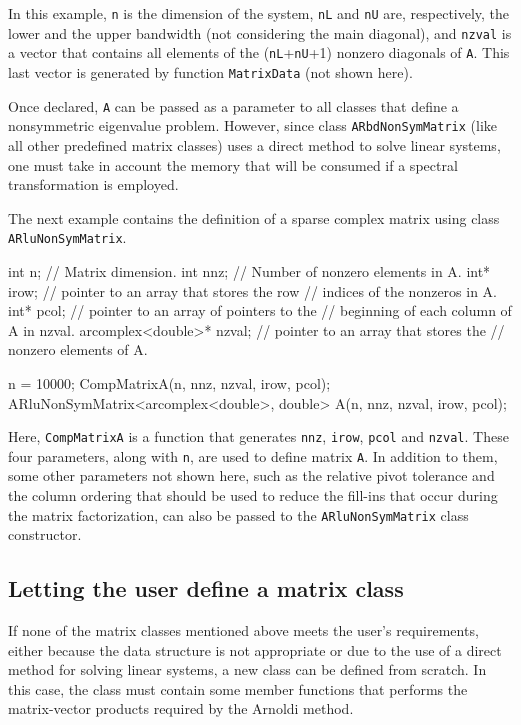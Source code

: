 In this example, \texttt{n} is the dimension of the system, \texttt{nL} and \texttt{nU} are, respectively, the lower and the upper bandwidth (not considering the main diagonal), and \texttt{nzval} is a vector that contains all elements of the (\texttt{nL}+\texttt{nU}+1) nonzero diagonals of \texttt{A}. This last vector is generated by function \texttt{MatrixData} (not shown here).

Once declared, \texttt{A} can be passed as a parameter to all \ARPP{} classes that define a nonsymmetric eigenvalue problem. However, since class \texttt{ARbdNonSymMatrix} (like all other predefined matrix classes) uses a direct method to solve linear systems, one must take in account the memory that will be consumed if a spectral transformation is employed.

The next example contains the definition of a sparse complex matrix using class \texttt{ARluNonSymMatrix}.

\begin{cppcode}
int                n;     // Matrix dimension.
int                nnz;   // Number of nonzero elements in A.
int*               irow;  // pointer to an array that stores the row
                          // indices of the nonzeros in A.
int*               pcol;  // pointer to an array of pointers to the
                          // beginning of each column of A in nzval.
arcomplex<double>* nzval; // pointer to an array that stores the
                          // nonzero elements of A.

n = 10000;
CompMatrixA(n, nnz, nzval, irow, pcol);
ARluNonSymMatrix<arcomplex<double>, double> A(n, nnz, nzval, irow, pcol);
\end{cppcode}

Here, \texttt{CompMatrixA} is a function that generates \texttt{nnz}, \texttt{irow}, \texttt{pcol} and \texttt{nzval}. These four parameters, along with \texttt{n}, are used to define matrix \texttt{A}. In addition to them, some other parameters not shown here, such as the relative pivot tolerance and the column ordering that should be used to reduce the fill-ins that occur during the matrix factorization, can also be passed to the \texttt{ARluNonSymMatrix} class constructor.

\subsection{Letting the user define a matrix class}

If none of the matrix classes mentioned above meets the user’s requirements, either because the data structure is not appropriate or due to the use of a direct method for solving linear systems, a new class can be defined from scratch. In this case, the class must contain some member functions that performs the matrix-vector products required by the Arnoldi method.

